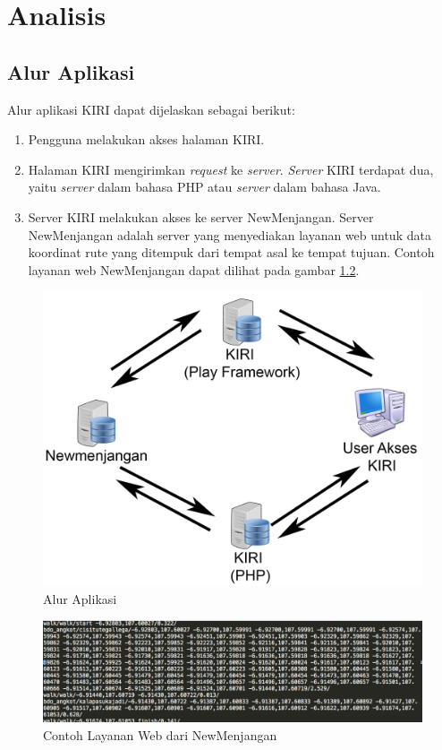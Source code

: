 \chapter{Analisis}
\label{chap:analisis}

\section{Alur Aplikasi}
Alur aplikasi KIRI dapat dijelaskan sebagai berikut:
\begin{enumerate}
	\item Pengguna melakukan akses halaman KIRI.
	\item Halaman KIRI mengirimkan \textit{request} ke \textit{server}. \textit{Server} KIRI terdapat dua, yaitu \textit{server} dalam bahasa PHP atau \textit{server} dalam bahasa Java.
	\item Server KIRI melakukan akses ke server NewMenjangan. Server NewMenjangan adalah server yang menyediakan layanan web untuk data koordinat rute yang ditempuk dari tempat asal ke tempat tujuan. Contoh layanan web NewMenjangan dapat dilihat pada gambar \ref{fig:3_menjanganservice}. 
\end{enumerate}
\begin{figure}[H]
	\centering
		\includegraphics[scale=0.2]{Gambar/analisis.jpg}
	\caption{Alur Aplikasi}
	\label{fig:1_kiritravel}
\end{figure}
\begin{figure}[H]
	\centering
		\includegraphics[scale=0.5]{Gambar/newmenjanganreq.png}
	\caption{Contoh Layanan Web dari NewMenjangan}
	\label{fig:3_menjanganservice}
\end{figure}

